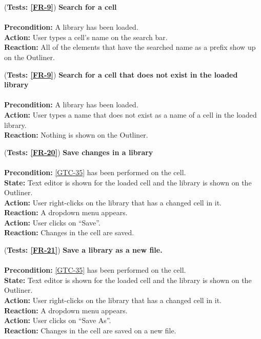 \documentclass[10pt,a4paper]{report}
\newcommand{\precondition}[1]{
    \textbf{Precondition: } #1 \leavevmode \\
}
\newcommand{\action}[1]{
    \textbf{Action: } #1 \leavevmode \\
}
\newcommand{\state}[1]{
    \textbf{State: } #1 \leavevmode \\
}
\newcommand{\reaction}[1]{
    \textbf{Reaction: } #1 \leavevmode \\
}
\newcommand{\GTCDescription}[2]{
    (\textbf{Tests: #1}) \textbf{#2} \leavevmode \\
}
\begin{document}
\begin{GTC}
    \item \GTCDescription{\ref{FR-9}}{Search for a cell} \leavevmode \\ \precondition{A library has been loaded.}\action{User types a cell’s name on the search bar.}\reaction{ All of the elements that have the searched name as a prefix show up on the Outliner.}
    
    \item \GTCDescription{\ref{FR-9}}{Search for a cell that does not exist in the loaded library} \leavevmode \\ \precondition{A library has been loaded.}\action{User types a name that does not exist as a name of a cell in the loaded library.}\reaction{Nothing is shown on the Outliner.}
    
    \item \GTCDescription{\ref{FR-20}}{Save changes in a library} \leavevmode \\ \precondition{\ref{GTC-35} has been performed on the cell.}\state{Text editor is shown for the loaded cell and the library is shown on the Outliner.}\action{User right-clicks on the library that has a changed cell in it.}\reaction{A dropdown menu appears.}\action{User clicks on “Save”.}\reaction{Changes in the cell are saved.}
    
    \item \GTCDescription{\ref{FR-21}}{Save a library as a new file.} \leavevmode \\ \precondition{\ref{GTC-35} has been performed on the cell.}\state{Text editor is shown for the loaded cell and the library is shown on the Outliner.}\action{User right-clicks on the library that has a changed cell in it.}\reaction{A dropdown menu appears.}\action{User clicks on “Save As”.}\reaction{Changes in the cell are saved on a new file.}
    
    
    
    
    
    
\end{GTC}
\end{document}

